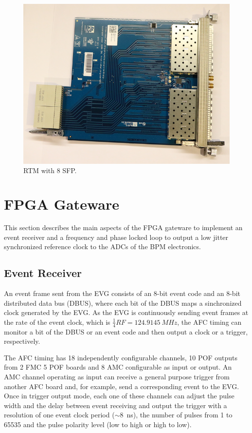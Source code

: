 \documentclass[a4paper,
               biblatex,      %
               ]{jacow}
\begin{document}
\begin{figure}[!htb]
   \centering
   \includegraphics*[width=0.8\columnwidth]{RTM_SFP_resized}
   \caption{RTM with 8 SFP.}
   \label{fig:rtm_sfp}
\end{figure}

\section{FPGA Gateware}

This section describes the main aspects of the FPGA gateware to implement an event receiver and a frequency and phase locked loop to output a low jitter synchronized reference clock to the ADCs of the BPM electronics.

\subsection{Event Receiver}

An event frame sent from the EVG consists of an 8-bit event code and an 8-bit distributed data bus (DBUS), where each bit of the DBUS maps a sinchronized clock generated by the EVG.
As the EVG is continuously sending event frames at the rate of the event clock, which is $\frac{1}{4}RF=124.9145~MHz$, the AFC timing can monitor a bit of the DBUS or an event code and then output a clock or a trigger, respectively. 

The AFC timing has 18 independently configurable channels, 10 POF outputs from 2 FMC 5 POF boards and 8 AMC configurable as input or output. An AMC channel operating as input can receive a general purpose trigger from another AFC board and, for example, send a corresponding event to the EVG. Once in trigger output mode, each one of these channels can adjust the pulse width and the delay between event receiving and output the trigger with a resolution of one event clock period ($\sim$8~ns), the number of pulses from 1 to 65535 and the pulse polarity level (low to high or high to low).  
\end{document}
